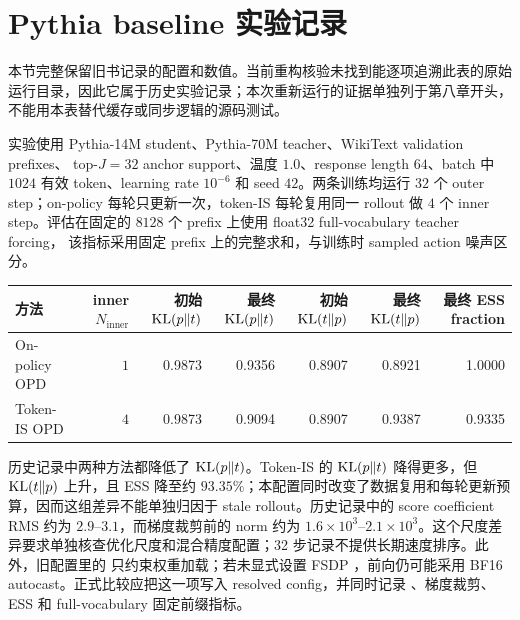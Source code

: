 \section{Pythia baseline 实验记录}
\label{subsec:ch2-opd-baseline-results}

本节完整保留旧书记录的配置和数值。当前重构核验未找到能逐项追溯此表的原始运行目录，因此它属于历史实验记录；本次重新运行的证据单独列于第八章开头，不能用本表替代缓存或同步逻辑的源码测试。

实验使用 Pythia-14M student、Pythia-70M teacher、WikiText validation prefixes、 top-$J=32$ anchor support、温度 $1.0$、response length $64$、batch 中 $1024$ 有效 token、learning rate $10^{-6}$ 和 seed $42$。两条训练均运行 $32$ 个 outer step；on-policy 每轮只更新一次，token-IS 每轮复用同一 rollout 做 $4$ 个 inner step。评估在固定的 $8128$ 个 prefix 上使用 float32 full-vocabulary teacher forcing， 该指标采用固定 prefix 上的完整求和，与训练时 sampled action 噪声区分。

\begin{center}
\small
\setlength{\tabcolsep}{3pt}
\begin{tabular}{lrrrrrr}
\toprule
方法 & inner $N_{\mathrm{inner}}$ & 初始 $\operatorname{KL}(p\Vert t)$ & 最终 $\operatorname{KL}(p\Vert t)$ & 初始 $\operatorname{KL}(t\Vert p)$ & 最终 $\operatorname{KL}(t\Vert p)$ & 最终 ESS fraction\\
\midrule
On-policy OPD & $1$ & 0.9873 & 0.9356 & 0.8907 & 0.8921 & 1.0000\\
Token-IS OPD & $4$ & 0.9873 & 0.9094 & 0.8907 & 0.9387 & 0.9335\\
\bottomrule
\end{tabular}
\end{center}

历史记录中两种方法都降低了 $\operatorname{KL}(p\Vert t)$。Token-IS 的 $\operatorname{KL}(p\Vert t)$ 降得更多，但 $\operatorname{KL}(t\Vert p)$ 上升，且 ESS 降至约 $93.35\%$；本配置同时改变了数据复用和每轮更新预算，因而这组差异不能单独归因于 stale rollout。历史记录中的 score coefficient RMS 约为 $2.9$--$3.1$，而梯度裁剪前的 norm 约为 $1.6\times10^3$--$2.1\times10^3$。这个尺度差异要求单独核查优化尺度和混合精度配置；32 步记录不提供长期速度排序。此外，旧配置里的  只约束权重加载；若未显式设置 FSDP ，前向仍可能采用 BF16 autocast。正式比较应把这一项写入 resolved config，并同时记录 、梯度裁剪、ESS 和 full-vocabulary 固定前缀指标。
